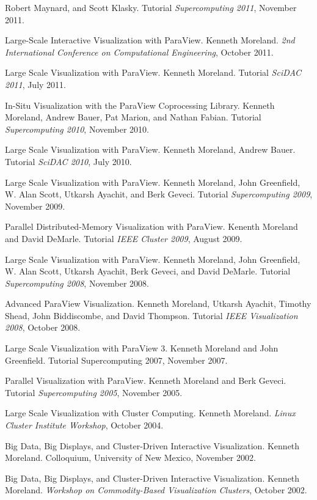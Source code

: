 \documentclass{article}
\begin{document}
\begin{enumerate}[label={[\arabic*]}]
  Robert Maynard, and Scott Klasky. Tutorial \emph{Supercomputing
    2011}, November 2011.
\item Large-Scale Interactive Visualization with ParaView. Kenneth
  Moreland. \emph{2nd International Conference on Computational
    Engineering}, October 2011.
\item Large Scale Visualization with ParaView. Kenneth
  Moreland. Tutorial \emph{SciDAC 2011}, July 2011.
\item In-Situ Visualization with the ParaView Coprocessing Library.
  Kenneth Moreland, Andrew Bauer, Pat Marion, and Nathan
  Fabian. Tutorial \emph{Supercomputing 2010}, November 2010.
\item Large Scale Visualization with ParaView. Kenneth Moreland,
  Andrew Bauer. Tutorial \emph{SciDAC 2010}, July 2010.
\item Large Scale Visualization with ParaView. Kenneth Moreland, John
  Greenfield, W. Alan Scott, Utkarsh Ayachit, and Berk Geveci. Tutorial
  \emph{Supercomputing 2009}, November 2009.
\item Parallel Distributed-Memory Visualization with ParaView. Kenenth
  Moreland and David DeMarle. Tutorial \emph{IEEE Cluster 2009}, August
  2009.
\item Large Scale Visualization with ParaView. Kenneth Moreland, John
  Greenfield, W. Alan Scott, Utkarsh Ayachit, Berk Geveci, and David
  DeMarle. Tutorial \emph{Supercomputing 2008}, November 2008.
\item Advanced ParaView Visualization. Kenneth Moreland, Utkarsh
  Ayachit, Timothy Shead, John Biddiscombe, and David
  Thompson. Tutorial \emph{IEEE Visualization 2008}, October 2008.
\item Large Scale Visualization with ParaView 3. Kenneth Moreland and
  John Greenfield. Tutorial Supercomputing 2007, November 2007.
\item Parallel Visualization with ParaView. Kenneth Moreland and Berk
  Geveci. Tutorial \emph{Supercomputing 2005}, November 2005.
\item Large Scale Visualization with Cluster Computing. Kenneth
  Moreland. \emph{Linux Cluster Institute Workshop}, October 2004.
\item Big Data, Big Displays, and Cluster-Driven Interactive
  Visualization. Kenneth Moreland. Colloquium, University of New
  Mexico, November 2002.
\item Big Data, Big Displays, and Cluster-Driven Interactive
  Visualization. Kenneth Moreland. \emph{Workshop on Commodity-Based
  Visualization Clusters}, October 2002.
\end{enumerate}
\end{document}
